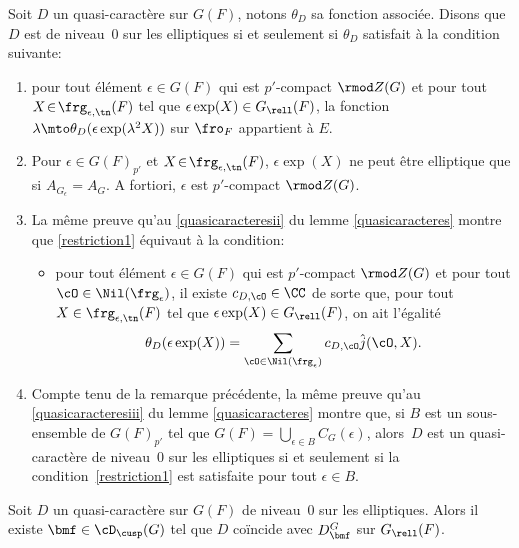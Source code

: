 Soit $D$ un quasi-caractère sur $G(F)$, notons $\theta_{D}$ sa fonction associée. Disons que $D$ est de niveau~$0$ sur les elliptiques si et seulement si $\theta_{D}$ satisfait à la condition suivante:
\begin{enumerate}
\item\label{restriction1}
pour tout élément $\epsilon\!\in\!G(F)$ qui est $p'$-compact $\rmod Z(G)$ et pour tout $X\!\in\!\frg_{\epsilon,\tn}(F)$ tel que $\epsilon \exp(X)\in G_{\rell}(F)$, la fonction $\lambda\mto \theta_{D}(\epsilon \exp(\lambda^2X))$ sur $\fro_{F}$ appartient à $E$.
\end{enumerate}

\skpt
\begin{rems*}
\begin{enumerate}\setcounter{enumi}{1}
\item\label{restriction2}
Pour $\epsilon\!\in\!G(F)_{p'}$ et $X\!\in\!\frg_{\epsilon,\tn}(F)$, $\epsilon \exp(X)$ ne peut être elliptique que si $A_{G_{\epsilon}}\!=\!A_{G}$. A fortiori, $\epsilon$ est $p'$-compact $\rmod Z(G)$.

\item\label{restriction3}
La même preuve qu'au \eqref{quasicaracteresii} du lemme \ref{quasicaracteres} montre que \eqref{restriction1} équivaut à la condition:
\begin{itemize}
\item
pour tout élément $\epsilon\in G(F)$ qui est $p'$-compact $\rmod Z(G)$ et pour tout $\cO\in \Nil(\frg_{\epsilon})$, il existe $c_{D,\cO}\in \CC$ de sorte que, pour tout $X\in \frg_{\epsilon,\tn}(F)$ tel que $\epsilon \exp(X)\in G_{\rell}(F)$, on ait l'égalité
\[
\theta_{D}(\epsilon \exp(X))=\sum_{\cO\in \Nil(\frg_{\epsilon})}c_{D,\cO}\hat{j}(\cO,X).
\]
\end{itemize}

\item\label{restriction4}
Compte tenu de la remarque précédente, la même preuve qu'au \eqref{quasicaracteresiii} du lemme \ref{quasicaracteres} montre que, si $B$ est un sous-ensemble de $G(F)_{p'}$ tel que $G(F)=\bigcup_{\epsilon\in B} C_{G}(\epsilon)$, alors~$D$ est un quasi-caractère de niveau~$0$ sur les elliptiques si et seulement si la condition~\eqref{restriction1} est satisfaite pour tout $\epsilon\in B$.
\end{enumerate}
\end{rems*}

\begin{prop*}
Soit $D$ un quasi-caractère sur $G(F)$ de niveau~$0$ sur les elliptiques. Alors il existe $\bmf\in \cD_{\cusp}(G)$ tel que $D$ coïncide avec $D^G_{\bmf}$ sur $G_{\rell}(F)$.
\end{prop*}

